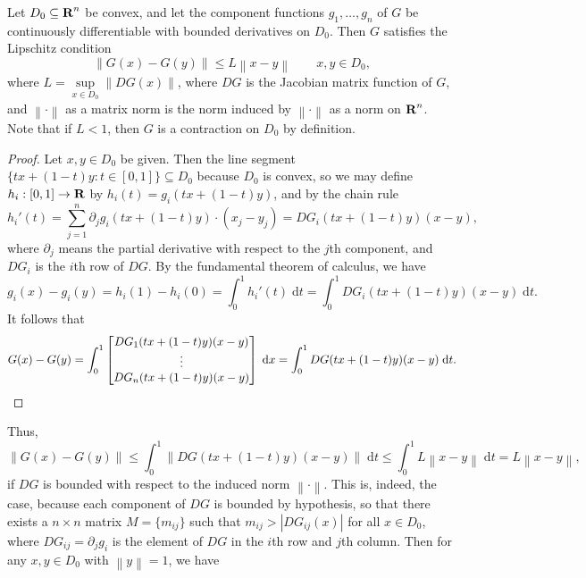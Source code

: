 \documentclass{homework}
\newcommand{\norm}[1]{\left\lVert{#1}\right\rVert}
\begin{document}
	\question Let $D_0 \subseteq \textbf{R}^n$ be convex, and let the component functions $g_1, \dots, g_n$ of $G$ be continuously differentiable with bounded derivatives on $D_0$. Then $G$ satisfies the Lipschitz condition
	\begin{equation}
		\label{eq:p2:lipschitz_condition}
		\norm{G(x) - G(y)} \le L\norm{x -y} \qquad x, y\in D_0,
	\end{equation}
	where $L = \sup\limits_{x\in D_0}\norm{DG(x)}$, where $DG$ is the Jacobian matrix function of $G$, and $\norm{\cdot}$ as a matrix norm is the norm induced by $\norm{\cdot}$ as a norm on $\textbf{R}^n$. Note that if $L < 1$, then $G$ is a contraction on $D_0$ by definition.
	\begin{proof}
		Let $x, y \in D_0$ be given. Then the line segment $\{tx + (1-t)y : t \in [0,1]\} \subseteq D_0$ because $D_0$ is convex, so we may define $h_i: [0,1] \to \textbf{R}$ by $h_i(t) = g_i(tx + (1-t)y)$, and by the chain rule
		\begin{equation*}
			h_i'(t) = \sum_{j=1}^n\partial_jg_i(tx+(1-t)y)\cdot(x_j - y_j) = DG_i(tx + (1-t)y)(x-y),
		\end{equation*}
		where $\partial_j$ means the partial derivative with respect to the $j$th component, and $DG_i$ is the $i$th row of $DG$. By the fundamental theorem of calculus, we have
		\begin{equation*}
			g_i(x) - g_i(y) = h_i(1) - h_i(0) = \int_0^1 h_i'(t)\;\text{d}t = \int_0^1DG_i(tx+(1-t)y)(x-y)\;\text{d}t.
		\end{equation*}
		It follows that
		\begin{equation*}
			G(x) - G(y) = \int_0^1 \left[\begin{matrix}DG_1(tx+(1-t)y)(x-y) \\ \vdots \\ DG_n(tx+(1-t)y)(x-y)\end{matrix}\right]\;\text{d}x = \int_0^1 DG(tx+(1-t)y)(x-y)\;\text{d}t.
		\end{equation*}
	\end{proof}
	Thus,
	\begin{equation*}
		\norm{G(x) - G(y)} \le \int_0^1\norm{DG(tx+(1-t)y)(x-y)}\;\text{d}t \le \int_0^1L\norm{x-y}\;\text{d}t = L\norm{x-y},
	\end{equation*}
	if $DG$ is bounded with respect to the induced norm $\norm{\cdot}$. This is, indeed, the case, because each component of $DG$ is bounded by hypothesis, so that there exists a $n\times n$ matrix $M = \{m_{ij}\}$ such that $m_{ij} > |DG_{ij}(x)|$ for all $x \in D_0$, where $DG_{ij} = \partial_jg_i$ is the element of $DG$ in the $i$th row and $j$th column. Then for any $x,y\in D_0$ with $\norm{y} = 1$, we have
\end{document}
